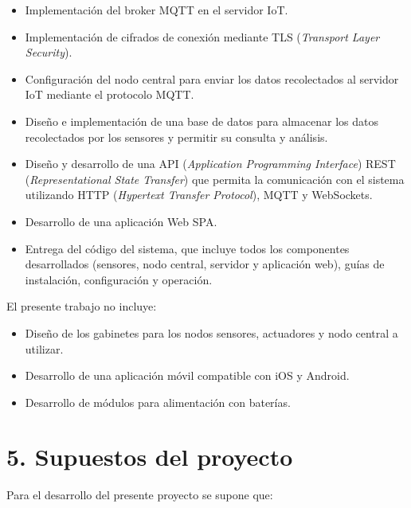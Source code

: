 \documentclass[
11pt, %
codirector, %
]{charter}
\begin{document}
\begin{itemize}
	\item Implementación del broker MQTT en el servidor IoT.
	\item Implementación de cifrados de conexión mediante TLS (\textit{Transport Layer
		      Security}).
	\item Configuración del nodo central para enviar los datos recolectados al servidor
	      IoT mediante el protocolo MQTT.
	\item Diseño e implementación de una base de datos para almacenar los datos
	      recolectados por los sensores y permitir su consulta y análisis.
	\item Diseño y desarrollo de una API (\textit{Application Programming Interface})
	      REST (\textit{Representational State Transfer}) que permita la comunicación con
	      el sistema utilizando HTTP (\textit{Hypertext Transfer Protocol}), MQTT y
	      WebSockets.
	\item Desarrollo de una aplicación Web SPA.
	\item Entrega del código del sistema, que incluye todos los componentes desarrollados
	      (sensores, nodo central, servidor y aplicación web), guías de instalación,
	      configuración y operación.
\end{itemize}

El presente trabajo no incluye:
\begin{itemize}
	\item Diseño de los gabinetes para los nodos sensores, actuadores y nodo central a
	      utilizar.
	\item Desarrollo de una aplicación móvil compatible con iOS y Android.
	\item Desarrollo de módulos para alimentación con baterías.
\end{itemize}

\section{5. Supuestos del proyecto}
\label{sec:supuestos}

Para el desarrollo del presente proyecto se supone que:
\end{document}
